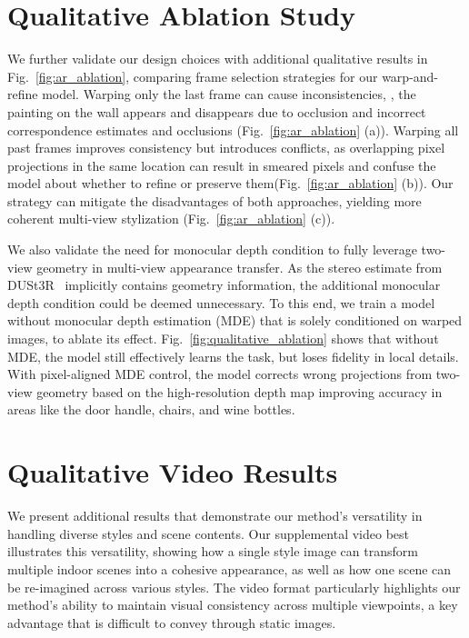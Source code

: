 \clearpage
\appendix


\section{Qualitative Ablation Study}
\label{sec:qual_ablation}

We further validate our design choices with additional qualitative results in Fig.~\ref{fig:ar_ablation}, comparing frame selection strategies for our warp-and-refine model.
Warping only the last frame can cause inconsistencies, \eg, the painting on the wall appears and disappears due to occlusion and incorrect correspondence estimates and occlusions (Fig.~\ref{fig:ar_ablation} (a)).
Warping all past frames improves consistency but introduces conflicts, as overlapping pixel projections in the same location can result in smeared pixels and confuse the model about whether to refine or preserve them(Fig.~\ref{fig:ar_ablation} (b)).
Our strategy can mitigate the disadvantages of both approaches, yielding more coherent multi-view stylization (Fig.~\ref{fig:ar_ablation} (c)). 

We also validate the need for monocular depth condition to fully leverage two-view geometry in multi-view appearance transfer. As the stereo estimate from DUSt3R~\cite{wang2024dust3r} implicitly contains geometry information, the additional monocular depth condition could be deemed unnecessary. To this end, we train a model without monocular depth estimation (MDE) that is solely conditioned on warped images, to ablate its effect.
Fig.~\ref{fig:qualitative_ablation} shows that without MDE, the model still effectively learns the task, but loses fidelity in local details.
With pixel-aligned MDE control, the model corrects wrong projections from two-view geometry based on the high-resolution depth map improving accuracy in areas like the door handle, chairs, and wine bottles.

\section{Qualitative Video Results}
\label{sec:more_quals}
We present additional results that demonstrate our method's versatility in handling diverse styles and scene contents. Our supplemental video best illustrates this versatility, showing how a single style image can transform multiple indoor scenes into a cohesive appearance, as well as how one scene can be re-imagined across various styles. The video format particularly highlights our method's ability to maintain visual consistency across multiple viewpoints, a key advantage that is difficult to convey through static images.


